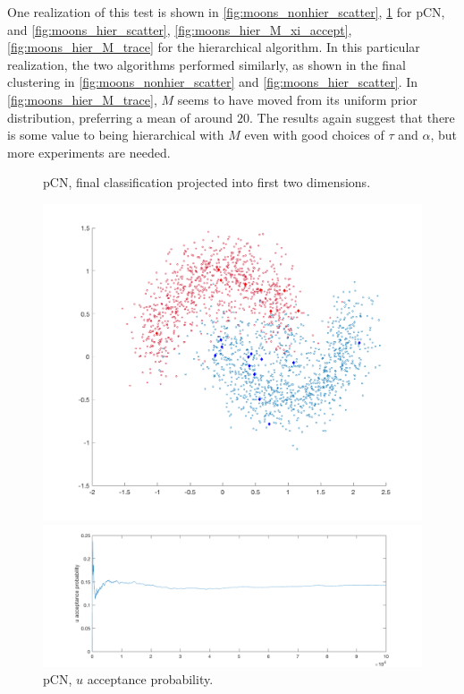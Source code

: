 \documentclass{siamart1116}
\begin{document}
            One realization of this test is shown in \cref{fig:moons_nonhier_scatter}, \cref{fig:moons_nonhier_u_accept} for pCN, and \cref{fig:moons_hier_scatter}, \cref{fig:moons_hier_M_xi_accept}, \cref{fig:moons_hier_M_trace} for the hierarchical algorithm.  In this particular realization, the two algorithms performed similarly, as shown in the final clustering in \cref{fig:moons_nonhier_scatter} and \cref{fig:moons_hier_scatter}. In \cref{fig:moons_hier_M_trace}, $M$ seems to have moved from its uniform prior distribution, preferring a mean of around $20$. The results again suggest that there is some value to being hierarchical with $M$ even with good choices of $\tau$ and $\alpha$, but more experiments are needed. 


            \begin{figure}[!htb]
            \begin{minipage}{0.48\textwidth}
                \centering
                \caption{\label{fig:moons_nonhier_scatter} pCN, final classification projected into first two dimensions.}
                \includegraphics[width=\linewidth]{learnM/moons/nonhier/sigma_0_20/scatter.png}
            \end{minipage} \hfill
            \begin{minipage}{0.48\textwidth}
                \centering
                \caption{\label{fig:moons_nonhier_u_accept} pCN, $u$ acceptance probability.}
                \includegraphics[width=\linewidth]{learnM/moons/nonhier/sigma_0_20/u_accept.png}
            \end{minipage}
            \end{figure}
\end{document}
